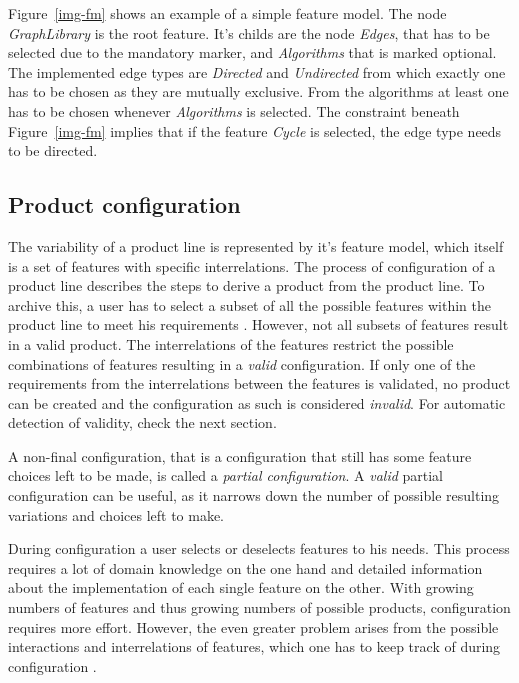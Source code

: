 Figure~\ref{img-fm} shows an example of a simple feature model. The node \textit{GraphLibrary} is the root feature. It's childs are the node \textit{Edges}, that has to be selected due to the mandatory marker, and \textit{Algorithms} that is marked optional. The implemented edge types are \textit{Directed} and \textit{Undirected} from which exactly one has to be chosen as they are mutually exclusive. From the algorithms at least one has to be chosen whenever \textit{Algorithms} is selected. The constraint beneath Figure~\ref{img-fm} implies that if the feature \textit{Cycle} is selected, the edge type needs to be directed.


\subsection{Product configuration}
The variability of a product line is represented by it's feature model, which itself is a set of features with specific interrelations. The process of configuration of a product line describes the steps to derive a product from the product line. To archive this, a user has to select a subset of all the possible features within the product line to meet his requirements \cite{vrt}. However, not all subsets of features result in a valid product. The interrelations of the features restrict the possible combinations of features resulting in a \textit{valid} configuration. If only one of the requirements from the interrelations between the features is validated, no product can be created and the configuration as such is considered \textit{invalid}. For automatic detection of validity, check the next section.

A non-final configuration, that is a configuration that still has some feature choices left to be made, is called a \textit{partial configuration}. A \textit{valid} partial configuration can be useful, as it narrows down the number of possible resulting variations and choices left to make.

During configuration a user selects or deselects features to his needs. This process requires a lot of domain knowledge on the one hand and detailed information about the implementation of each single feature on the other. With growing numbers of features and thus growing numbers of possible products, configuration requires more effort. However, the even greater problem arises from the possible interactions and interrelations of features, which one has to keep track of during configuration \cite{sple-fpt}.

